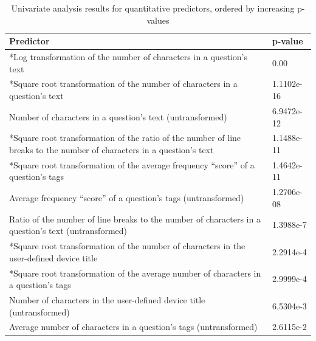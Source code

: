 \documentclass{article}
\begin{document}
\begin{table}[ht]
\centering
\caption{Univariate analysis results for quantitative predictors, ordered by increasing p-values} 
\begin{tabular}{|p{12cm}|p{2cm}|}
  \hline
  Predictor & p-value \\ 
  \hline \hline
  *Log transformation of the number of characters in a question's text & 0.00 \\ 
  \hline
  *Square root transformation of the number of characters in a question's text & 1.1102e-16 \\ 
  \hline
  Number of characters in a question's text (untransformed) & 6.9472e-12 \\
  \hline
  *Square root transformation of the ratio of the number of line breaks to the number of characters in a question's text & 1.1488e-11 \\ 
  \hline
  *Square root transformation of the average frequency ``score'' of a question's tags & 1.4642e-11 \\ 
  \hline
  Average frequency ``score'' of a question's tags (untransformed) & 1.2706e-08 \\ 
  \hline
  Ratio of the number of line breaks to the number of characters in a question's text (untransformed) & 1.3988e-7 \\ 
  \hline
  *Square root transformation of the number of characters in the user-defined device title & 2.2914e-4 \\ 
  \hline
  *Square root transformation of the average number of characters in a question's tags & 2.9999e-4 \\ 
  \hline
  Number of characters in the user-defined device title (untransformed) & 6.5304e-3 \\ 
  \hline
  Average number of characters in a question's tags (untransformed) & 2.6115e-2 \\ 
   \hline
\end{tabular}
\label{table:qresults}
\end{table}
\end{document}
